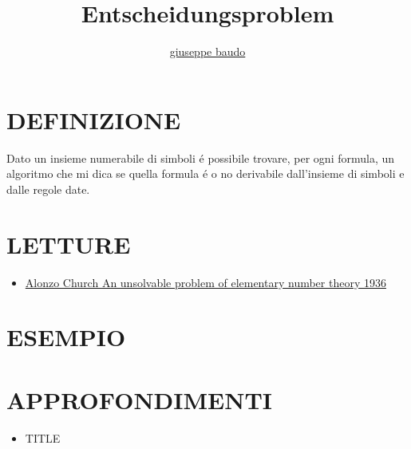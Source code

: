 \documentclass[a4paper,10pt]{article}
\title{Entscheidungsproblem}
\author{\href{http://www.baudo.hol.es}{giuseppe baudo}}
\begin{document}
\maketitle

\section{DEFINIZIONE}
Dato un insieme numerabile di simboli \'{e} possibile trovare, per ogni formula, un algoritmo che mi dica se quella formula \'{e} o no derivabile dall'insieme di simboli e dalle regole date.

\section{LETTURE}
\begin{itemize}
 \item \href{./resources/church-1936.pdf}{Alonzo Church An unsolvable problem of elementary number theory 1936}
\end{itemize}


\section{ESEMPIO}

\section{APPROFONDIMENTI}
\begin{itemize}
 \item TITLE
\end{itemize}
\end{document}
